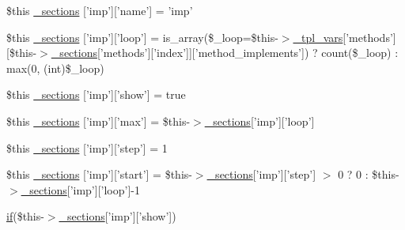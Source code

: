 \begin{DoxyCompactItemize}
\item 
\$this \hyperlink{default_234d6fa4bfd5eef6424a9ddc74a166350_2_06_06-14_05_06_06-1407541581_05method_8tpl_8php_a0accdaaabc80cf5dea3de9bde64989f4}{\-\_\-sections} \mbox{[}'imp'\mbox{]}\mbox{[}'name'\mbox{]} = 'imp'
\item 
\$this \hyperlink{default_234d6fa4bfd5eef6424a9ddc74a166350_2_06_06-14_05_06_06-1407541581_05method_8tpl_8php_a9e7ef0bc5f5cad2c3eeffe0e85dacfe2}{\-\_\-sections} \mbox{[}'imp'\mbox{]}\mbox{[}'loop'\mbox{]} = is\-\_\-array(\$\-\_\-loop=\$this-\/$>$\hyperlink{_06_06127_05_06_0612781687_05pkgelementindex_8tpl_8php_a4a4846d8e68d455590131a05697f67a3}{\-\_\-tpl\-\_\-vars}\mbox{[}'methods'\mbox{]}\mbox{[}\$this-\/$>$\hyperlink{_06_06127_05_06_0612781687_05pkgelementindex_8tpl_8php_a9e3d26b39edfe29c3f29b8035ef33828}{\-\_\-sections}\mbox{[}'methods'\mbox{]}\mbox{[}'index'\mbox{]}\mbox{]}\mbox{[}'method\-\_\-implements'\mbox{]}) ? count(\$\-\_\-loop) \-: max(0, (int)\$\-\_\-loop)
\item 
\$this \hyperlink{default_234d6fa4bfd5eef6424a9ddc74a166350_2_06_06-14_05_06_06-1407541581_05method_8tpl_8php_ab34e45ac83e6be02ba4da97523aa9253}{\-\_\-sections} \mbox{[}'imp'\mbox{]}\mbox{[}'show'\mbox{]} = true
\item 
\$this \hyperlink{default_234d6fa4bfd5eef6424a9ddc74a166350_2_06_06-14_05_06_06-1407541581_05method_8tpl_8php_a72afb3c599b7d132e7a48cbe46dabb42}{\-\_\-sections} \mbox{[}'imp'\mbox{]}\mbox{[}'max'\mbox{]} = \$this-\/$>$\hyperlink{_06_06127_05_06_0612781687_05pkgelementindex_8tpl_8php_a9e3d26b39edfe29c3f29b8035ef33828}{\-\_\-sections}\mbox{[}'imp'\mbox{]}\mbox{[}'loop'\mbox{]}
\item 
\$this \hyperlink{default_234d6fa4bfd5eef6424a9ddc74a166350_2_06_06-14_05_06_06-1407541581_05method_8tpl_8php_ac7e9e053f36ea23aa6934f2533aac365}{\-\_\-sections} \mbox{[}'imp'\mbox{]}\mbox{[}'step'\mbox{]} = 1
\item 
\$this \hyperlink{default_234d6fa4bfd5eef6424a9ddc74a166350_2_06_06-14_05_06_06-1407541581_05method_8tpl_8php_a1a4a2efa6cee9bc20cf1fa3f78ba7d41}{\-\_\-sections} \mbox{[}'imp'\mbox{]}\mbox{[}'start'\mbox{]} = \$this-\/$>$\hyperlink{_06_06127_05_06_0612781687_05pkgelementindex_8tpl_8php_a9e3d26b39edfe29c3f29b8035ef33828}{\-\_\-sections}\mbox{[}'imp'\mbox{]}\mbox{[}'step'\mbox{]} $>$ 0 ? 0 \-: \$this-\/$>$\hyperlink{_06_06127_05_06_0612781687_05pkgelementindex_8tpl_8php_a9e3d26b39edfe29c3f29b8035ef33828}{\-\_\-sections}\mbox{[}'imp'\mbox{]}\mbox{[}'loop'\mbox{]}-\/1
\item 
\hyperlink{_setup_8inc_8php_ad0184337b31d13763ec8751feff4aabe}{if}(\$this-\/$>$\hyperlink{_06_06127_05_06_0612781687_05pkgelementindex_8tpl_8php_a9e3d26b39edfe29c3f29b8035ef33828}{\-\_\-sections}\mbox{[}'imp'\mbox{]}\mbox{[}'show'\mbox{]}) \*

\end{DoxyCompactItemize}
